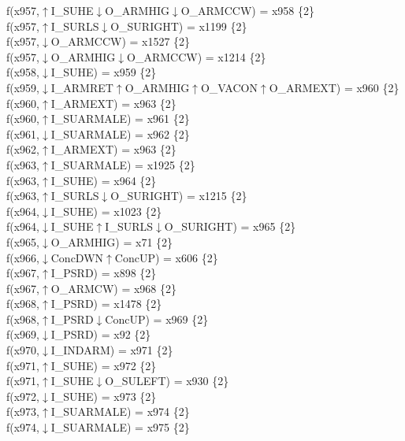 f(x957,$\uparrow$I\_SUHE$\downarrow$O\_ARMHIG$\downarrow$O\_ARMCCW) = x958 \{2\} \\  
f(x957,$\uparrow$I\_SURLS$\downarrow$O\_SURIGHT) = x1199 \{2\} \\  
f(x957,$\downarrow$O\_ARMCCW) = x1527 \{2\} \\  
f(x957,$\downarrow$O\_ARMHIG$\downarrow$O\_ARMCCW) = x1214 \{2\} \\  
f(x958,$\downarrow$I\_SUHE) = x959 \{2\} \\  
f(x959,$\downarrow$I\_ARMRET$\uparrow$O\_ARMHIG$\uparrow$O\_VACON$\uparrow$O\_ARMEXT) = x960 \{2\} \\  
f(x960,$\uparrow$I\_ARMEXT) = x963 \{2\} \\  
f(x960,$\uparrow$I\_SUARMALE) = x961 \{2\} \\  
f(x961,$\downarrow$I\_SUARMALE) = x962 \{2\} \\  
f(x962,$\uparrow$I\_ARMEXT) = x963 \{2\} \\  
f(x963,$\uparrow$I\_SUARMALE) = x1925 \{2\} \\  
f(x963,$\uparrow$I\_SUHE) = x964 \{2\} \\  
f(x963,$\uparrow$I\_SURLS$\downarrow$O\_SURIGHT) = x1215 \{2\} \\  
f(x964,$\downarrow$I\_SUHE) = x1023 \{2\} \\  
f(x964,$\downarrow$I\_SUHE$\uparrow$I\_SURLS$\downarrow$O\_SURIGHT) = x965 \{2\} \\  
f(x965,$\downarrow$O\_ARMHIG) = x71 \{2\} \\  
f(x966,$\downarrow$ConcDWN$\uparrow$ConcUP) = x606 \{2\} \\  
f(x967,$\uparrow$I\_PSRD) = x898 \{2\} \\  
f(x967,$\uparrow$O\_ARMCW) = x968 \{2\} \\  
f(x968,$\uparrow$I\_PSRD) = x1478 \{2\} \\  
f(x968,$\uparrow$I\_PSRD$\downarrow$ConcUP) = x969 \{2\} \\  
f(x969,$\downarrow$I\_PSRD) = x92 \{2\} \\  
f(x970,$\downarrow$I\_INDARM) = x971 \{2\} \\  
f(x971,$\uparrow$I\_SUHE) = x972 \{2\} \\  
f(x971,$\uparrow$I\_SUHE$\downarrow$O\_SULEFT) = x930 \{2\} \\  
f(x972,$\downarrow$I\_SUHE) = x973 \{2\} \\  
f(x973,$\uparrow$I\_SUARMALE) = x974 \{2\} \\  
f(x974,$\downarrow$I\_SUARMALE) = x975 \{2\} \\  
